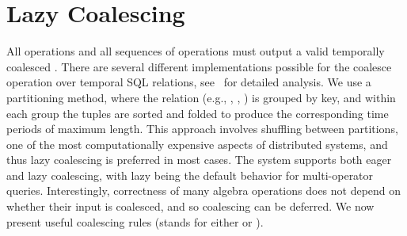 \section{Lazy Coalescing}
\label{sec:sys:coal}


All operations and all sequences of operations must output a valid
temporally coalesced \tg.  There are several different implementations
possible for the coalesce operation over temporal SQL relations,
see~\cite{DBLP:conf/vldb/BohlenSS96} for detailed analysis.  We use a
partitioning method, where the relation (e.g., \tv, \te, \trg) is
grouped by key, and within each group the tuples are sorted and folded
to produce the corresponding time periods of maximum length.  This
approach involves shuffling between partitions, one of the most
computationally expensive aspects of distributed systems, and thus
lazy coalescing is preferred in most cases.  The \ql system supports
both eager and lazy coalescing, with lazy being the default behavior
for multi-operator queries. Interestingly, correctness of many \tg
algebra operations does not depend on whether their input is
coalesced, and so coalescing can be deferred.
%
We now present useful coalescing rules (\ttt stands for either \trg or
\tve).


